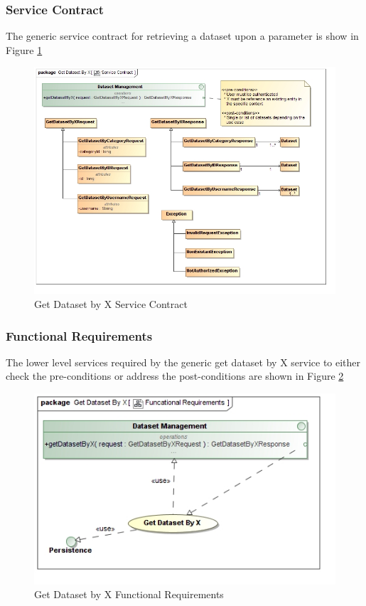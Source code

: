 \subsubsection{Service Contract}
The generic service contract for retrieving a dataset upon a parameter is show in
Figure \ref{fig:getDatasetByXServiceContract}
\begin{figure}[H]
  \begin{center}
  \includegraphics[scale=0.38]{../Diagrams and Charts/Repository Management/Get Dataset By X Service Contract.jpg}
  \caption{Get Dataset by X Service Contract}
  \label{fig:getDatasetByXServiceContract}
  \end{center}
\end{figure}

\subsubsection{Functional Requirements}
The lower level services required by the generic get dataset by X service
to either check the pre-conditions or address the post-conditions are shown in Figure 
\ref{fig:getDatasetByXFuncReq}
\begin{figure}[H]
  \begin{center}
  \includegraphics[scale=0.38]{../Diagrams and Charts/Repository Management/Get Dataset By X Funcational Requirements.jpg}
  \caption{Get Dataset by X Functional Requirements}
  \label{fig:getDatasetByXFuncReq}
  \end{center}
\end{figure}



